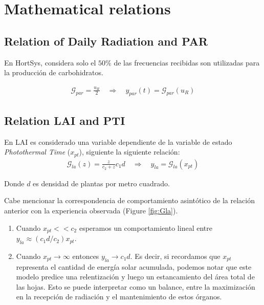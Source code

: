 \section{Mathematical relations}

\subsection{Relation of Daily Radiation and PAR}

En HortSys, considera  solo el $50\%$ de las frecuencias recibidas son utilizadas para la producción de carbohidratos.
        
        \begin{gather}
            \mathcal{G}_{par} = \frac{u_{R}}{2}
            \hspace{1em} \Rightarrow \hspace{1em}
            y_{par}(t) = \mathcal{G}_{par} (u_{R})
        \end{gather}


\subsection{Relation LAI and PTI}

En \cite{Martinez-Ruiz2019} LAI es considerado una variable  dependiente de la variable de estado \emph{Photothermal Time} ($x_{pt}$), siguiente la siguiente relación:
\begin{gather}
    \mathcal{G}_{la}(z) =  \frac{z}{c_2 + z}c_1 d    
    \hspace{1em} \Rightarrow \hspace{1em}
    y_{la} = \mathcal{G}_{la}(x_{pt})
\end{gather}

Donde $d$ es densidad de plantas por metro cuadrado.

Cabe mencionar la correspondencia de comportamiento asintótico de la relación anterior con la experiencia observada (Figure \ref{fig:Gla}). 
\begin{enumerate}
    \item  Cuando $x_{pt} << c_2 $ esperamos un comportamiento lineal entre $  y_{la} \approx (c_1 d/c_2) x_{pt} $.
    \item Cuando $x_{pt} \to \infty $ entonces $y_{la} \to c_1 d$. Es decir, si recordamos que $x_{pt}$ representa el cantidad de energía solar acumulada, podemos notar que este modelo predice una relentización y luego un estancamiento del área total de las hojas. Esto se puede interpretar como un balance, entre la maximización en la recepción de radiación y el mantenimiento de estos órganos.
    
\end{enumerate}

